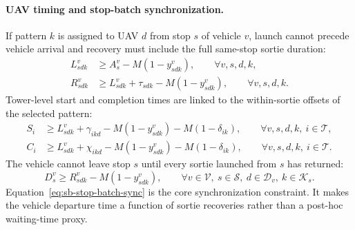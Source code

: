 \paragraph{UAV timing and stop-batch synchronization.}
If pattern \(k\) is assigned to UAV \(d\) from stop \(s\) of vehicle \(v\), launch cannot precede vehicle arrival and recovery must include the full same-stop sortie duration:
\begin{align}
L^v_{sdk}&\geq A^v_s-M(1-y^v_{sdk}),
\qquad \forall v,s,d,k,
\label{eq:sb-uav-start}\\
R^v_{sdk}&\geq L^v_{sdk}+\tau_{sdk}-M(1-y^v_{sdk}),
\qquad \forall v,s,d,k.
\label{eq:sb-uav-completion}
\end{align}
Tower-level start and completion times are linked to the within-sortie offsets of the selected pattern:
\begin{align}
S_i&\geq L^v_{sdk}+\gamma_{ikd}-M(1-y^v_{sdk})-M(1-\delta_{ik}),
\qquad \forall v,s,d,k,\ i\in\mathcal{T},
\label{eq:sb-pattern-tower-start}\\
C_i&\geq L^v_{sdk}+\chi_{ikd}-M(1-y^v_{sdk})-M(1-\delta_{ik}),
\qquad \forall v,s,d,k,\ i\in\mathcal{T}.
\label{eq:sb-pattern-tower-completion}
\end{align}
The vehicle cannot leave stop \(s\) until every sortie launched from \(s\) has returned:
\begin{equation}
D^v_s\geq R^v_{sdk}-M(1-y^v_{sdk}),
\qquad \forall v\in\mathcal{V},\ s\in\mathcal{S},\ d\in\mathcal{D}_v,\ k\in\mathcal{K}_s.
\label{eq:sb-stop-batch-sync}
\end{equation}
Equation~\eqref{eq:sb-stop-batch-sync} is the core synchronization constraint. It makes the vehicle departure time a function of sortie recoveries rather than a post-hoc waiting-time proxy.

